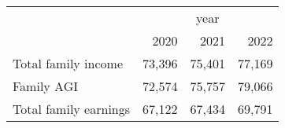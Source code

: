 \documentclass{article}
\begin{document}
\begin{tabular}{llll}
\cline{1-4}
\multicolumn{1}{c}{} &
  \multicolumn{3}{|c}{year} \\
\multicolumn{1}{c}{} &
  \multicolumn{1}{|r}{2020} &
  \multicolumn{1}{r}{2021} &
  \multicolumn{1}{r}{2022} \\
\cline{1-4}
\multicolumn{1}{l}{Total family income} &
  \multicolumn{1}{|r}{73,396} &
  \multicolumn{1}{r}{75,401} &
  \multicolumn{1}{r}{77,169} \\
\multicolumn{1}{l}{Family AGI} &
  \multicolumn{1}{|r}{72,574} &
  \multicolumn{1}{r}{75,757} &
  \multicolumn{1}{r}{79,066} \\
\multicolumn{1}{l}{Total family earnings} &
  \multicolumn{1}{|r}{67,122} &
  \multicolumn{1}{r}{67,434} &
  \multicolumn{1}{r}{69,791} \\
\cline{1-4}
\end{tabular}
\end{document}
